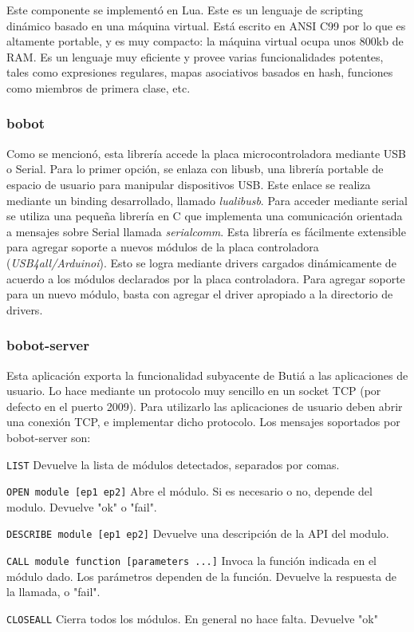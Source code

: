 Este componente se implementó en Lua. Este es un lenguaje de scripting dinámico basado en una máquina virtual. Está escrito en ANSI C99 por lo que es altamente portable, y es muy compacto: la máquina virtual ocupa unos 800kb de RAM. Es un lenguaje muy eficiente y provee varias funcionalidades potentes, tales como expresiones regulares, mapas asociativos basados en hash, funciones como miembros de primera clase, etc.

\subsubsection*{bobot}

Como se mencionó, esta librería accede la placa microcontroladora mediante USB o Serial. Para lo primer opci\'on, se enlaza con libusb, una librería portable de espacio de usuario para manipular dispositivos USB. Este enlace se realiza mediante un binding desarrollado, llamado \textit{lualibusb}. Para acceder mediante serial se utiliza una pequeña librería en C que implementa una comunicación orientada a mensajes sobre Serial llamada \textit{serialcomm}.
Esta librería es fácilmente extensible para agregar soporte a nuevos módulos de la placa controladora (\textit{USB4all/Arduinoi}). Esto se logra mediante drivers cargados dinámicamente de acuerdo a los módulos declarados por la placa controladora. Para agregar soporte para un nuevo módulo, basta con agregar el driver apropiado a la directorio de drivers.
\subsubsection*{bobot-server}

Esta aplicaci\'on exporta la funcionalidad subyacente de Buti\'a a las aplicaciones de usuario. Lo hace mediante un protocolo muy sencillo en un socket TCP (por defecto en el puerto 2009). Para utilizarlo las aplicaciones de usuario deben abrir una conexi\'on TCP, e implementar dicho protocolo. Los mensajes soportados por bobot-server son:

 \texttt{LIST}
Devuelve la lista de m\'odulos detectados, separados por comas.
 
\texttt{OPEN module [ep1 ep2]}
Abre el m\'odulo. Si es necesario o no, depende del modulo. Devuelve
"ok" o "fail". 

\texttt{DESCRIBE module [ep1 ep2]}
Devuelve una descripci\'on de la API del modulo.

\texttt{CALL module  function [parameters ...]}
Invoca la funci\'on indicada en el m\'odulo dado. Los par\'ametros dependen de
la funci\'on. Devuelve la respuesta de la llamada, o "fail".

\texttt{CLOSEALL}
Cierra todos los m\'odulos. En general no hace falta. Devuelve "ok"









